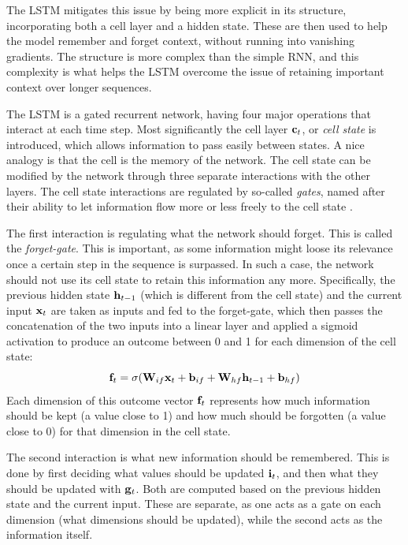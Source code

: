 \documentclass[a4paper,12pt]{article}
\begin{document}
The LSTM mitigates this issue by being more explicit in its structure, incorporating both a cell layer and a hidden state. These are then used to help the model remember and forget context, without running into vanishing gradients. The structure is more complex than the simple RNN, and this complexity is what helps the LSTM overcome the issue of retaining important context over longer sequences.

The LSTM is a gated recurrent network, having four major operations that interact at each time step. Most significantly the cell layer $\mathbf{ c }_t$, or \textit{cell state} is introduced, which allows information to pass easily between states. A nice analogy is that the cell is the memory of the network. The cell state can be modified by the network through three separate interactions with the other layers. The cell state interactions are regulated by so-called \textit{gates}, named after their ability to let information flow more or less freely to the cell state \cite{lstmwebsite}.

The first interaction is regulating what the network should forget. This is called the \textit{forget-gate}. This is important, as some information might loose its relevance once a certain step in the sequence is surpassed. In such a case, the network should not use its cell state to retain this information any more. Specifically, the previous hidden state $\mathbf{ h }_{t-1}$ (which is different from the cell state) and the current input $\mathbf{ x }_t$ are taken as inputs and fed to the forget-gate, which then passes the concatenation of the two inputs into a linear layer and applied a sigmoid activation to produce an outcome between 0 and 1 for each dimension of the cell state:
\[\mathbf{ f }_t = \sigma {\mathopen{} \left( \mathbf{ W }_{if} \mathbf{ x }_t + \mathbf{ b }_{if} + \mathbf{ W }_{hf}\mathbf{ h }_{t-1} + \mathbf{ b }_{hf} \right) \mathclose{}}\]
Each dimension of this outcome vector $\mathbf{ f }_t$ represents how much information should be kept (a value close to 1) and how much should be forgotten (a value close to 0) for that dimension in the cell state.

The second interaction is what new information should be remembered. This is done by first deciding what values should be updated $\mathbf{ i }_t$, and then what they should be updated with $\mathbf{ g }_t$. Both are computed based on the previous hidden state and the current input. These are separate, as one acts as a gate on each dimension (what dimensions should be updated), while the second acts as the information itself.
\end{document}

